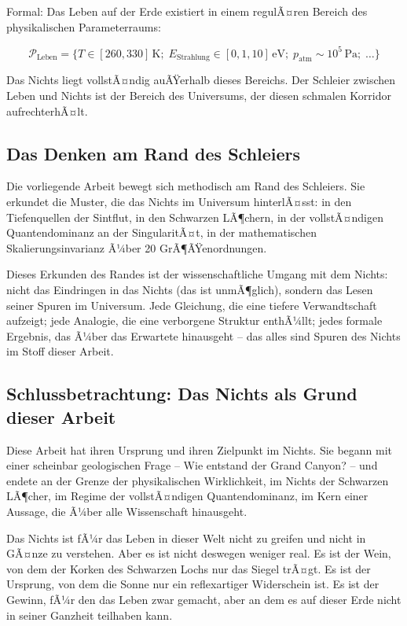 ﻿\documentclass[12pt,a4paper]{report}
\begin{document}
Formal: Das Leben auf der Erde existiert in einem regulÃ¤ren Bereich des physikalischen Parameterraums:

\begin{equation}
	\mathcal{P}_{\text{Leben}} = \bigl\{T \in [260, 330]\,\text{K};\; E_{\text{Strahlung}} \in [0{,}1, 10]\,\text{eV};\; p_{\text{atm}} \sim 10^5\,\text{Pa};\; \ldots\bigr\}
	\label{eq:parameter_leben}
\end{equation}

Das Nichts liegt vollstÃ¤ndig auÃŸerhalb dieses Bereichs. Der Schleier zwischen Leben und Nichts ist der Bereich des Universums, der diesen schmalen Korridor aufrechterhÃ¤lt.

\subsection{Das Denken am Rand des Schleiers}

Die vorliegende Arbeit bewegt sich methodisch am Rand des Schleiers. Sie erkundet die Muster, die das Nichts im Universum hinterlÃ¤sst: in den Tiefenquellen der Sintflut, in den Schwarzen LÃ¶chern, in der vollstÃ¤ndigen Quantendominanz an der SingularitÃ¤t, in der mathematischen Skalierungsinvarianz Ã¼ber 20 GrÃ¶ÃŸenordnungen.

Dieses Erkunden des Randes ist der wissenschaftliche Umgang mit dem Nichts: nicht das Eindringen in das Nichts (das ist unmÃ¶glich), sondern das Lesen seiner Spuren im Universum. Jede Gleichung, die eine tiefere Verwandtschaft aufzeigt; jede Analogie, die eine verborgene Struktur enthÃ¼llt; jedes formale Ergebnis, das Ã¼ber das Erwartete hinausgeht -- das alles sind Spuren des Nichts im Stoff dieser Arbeit.

\subsection{Schlussbetrachtung: Das Nichts als Grund dieser Arbeit}

Diese Arbeit hat ihren Ursprung und ihren Zielpunkt im Nichts. Sie begann mit einer scheinbar geologischen Frage -- Wie entstand der Grand Canyon? -- und endete an der Grenze der physikalischen Wirklichkeit, im Nichts der Schwarzen LÃ¶cher, im Regime der vollstÃ¤ndigen Quantendominanz, im Kern einer Aussage, die Ã¼ber alle Wissenschaft hinausgeht.

Das Nichts ist fÃ¼r das Leben in dieser Welt nicht zu greifen und nicht in GÃ¤nze zu verstehen. Aber es ist nicht deswegen weniger real. Es ist der Wein, von dem der Korken des Schwarzen Lochs nur das Siegel trÃ¤gt. Es ist der Ursprung, von dem die Sonne nur ein reflexartiger Widerschein ist. Es ist der Gewinn, fÃ¼r den das Leben zwar gemacht, aber an dem es auf dieser Erde nicht in seiner Ganzheit teilhaben kann.
\end{document}
